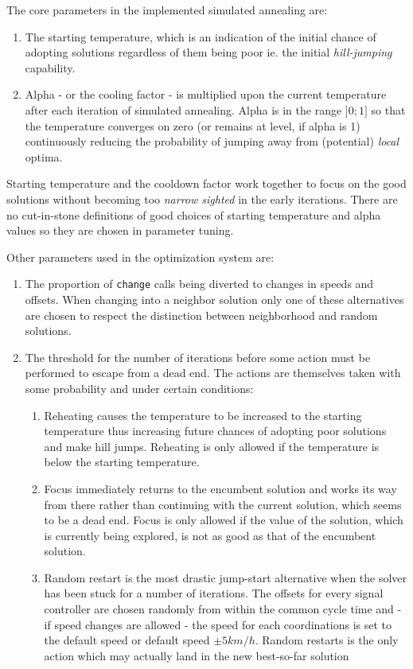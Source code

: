 The core parameters in the implemented simulated annealing are:
\begin{enumerate}
\item The starting temperature, which is an indication of the initial chance of adopting solutions regardless of them being poor ie. the initial \textit{hill-jumping} capability.
\item Alpha - or the cooling factor - is multiplied upon the current temperature after each iteration of simulated annealing. Alpha is in the range $]0;1]$ so that the temperature converges on zero (or remains at level, if alpha is 1) continuously reducing the probability of jumping away from (potential) \textit{local} optima.
\end{enumerate}

Starting temperature and the cooldown factor work together to focus on the good solutions without becoming too \textit{narrow sighted} in the early iterations. There are no cut-in-stone definitions of good choices of starting temperature and alpha values so they are chosen in parameter tuning.

Other parameters used in the optimization system are:

\begin{enumerate}
\item The proportion of \verb|change| calls being diverted to changes in speeds and offsets. When changing into a neighbor solution only one of these alternatives are chosen to respect the distinction between neighborhood and random solutions.
\item The threshold for the number of iterations before some action must be performed to escape from a dead end. The actions are themselves taken with some probability and under certain conditions:
\begin{enumerate}
\item Reheating causes the temperature to be increased to the starting temperature thus increasing future chances of adopting poor solutions and make hill jumps. Reheating is only allowed if the temperature is below the starting temperature.
\item Focus immediately returns to the encumbent solution and works its way from there rather than continuing with the current solution, which seems to be a dead end. Focus is only allowed if the value of the solution, which is currently being explored, is not as good as that of the encumbent solution.
\item Random restart is the most drastic jump-start alternative when the solver has been stuck for a number of iterations. The offsets for every signal controller are chosen randomly from within the common cycle time and - if speed changes are allowed - the speed for each coordinations is set to the default speed or default speed $\pm 5km/h$. Random restarts is the only action which may actually land in the new best-so-far solution
\end{enumerate}
\end{enumerate}

